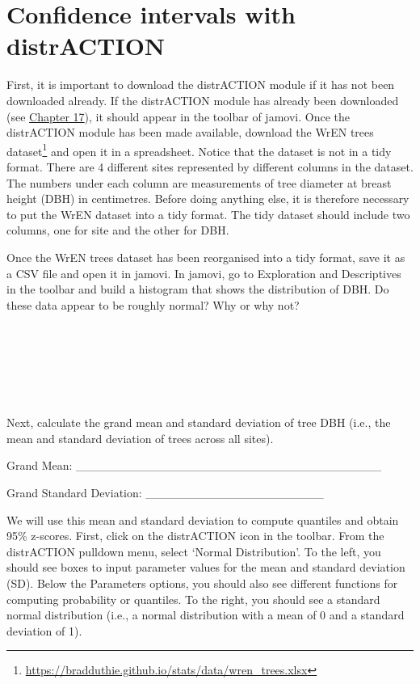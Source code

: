 \documentclass[
  openany]{krantz}
\begin{document}
\hypertarget{confidence-intervals-with-distraction}{%
\section{Confidence intervals with distrACTION}\label{confidence-intervals-with-distraction}}

First, it is important to download the distrACTION module if it has not been downloaded already.
If the distrACTION module has already been downloaded (see \protect\hyperlink{Chapter_17}{Chapter 17}), it should appear in the toolbar of jamovi.
Once the distrACTION module has been made available, download the WrEN trees dataset\footnote{\url{https://bradduthie.github.io/stats/data/wren_trees.xlsx}} and open it in a spreadsheet.
Notice that the dataset is not in a tidy format.
There are 4 different sites represented by different columns in the dataset.
The numbers under each column are measurements of tree diameter at breast height (DBH) in centimetres.
Before doing anything else, it is therefore necessary to put the WrEN dataset into a tidy format.
The tidy dataset should include two columns, one for site and the other for DBH.

Once the WrEN trees dataset has been reorganised into a tidy format, save it as a CSV file and open it in jamovi.
In jamovi, go to Exploration and Descriptives in the toolbar and build a histogram that shows the distribution of DBH.
Do these data appear to be roughly normal?
Why or why not?

\begin{verbatim}






\end{verbatim}

Next, calculate the grand mean and standard deviation of tree DBH (i.e., the mean and standard deviation of trees across all sites).

Grand Mean: \_\_\_\_\_\_\_\_\_\_\_\_\_\_\_\_\_\_\_\_\_\_\_\_\_\_\_\_\_\_\_\_\_\_\_\_

Grand Standard Deviation: \_\_\_\_\_\_\_\_\_\_\_\_\_\_\_\_\_\_\_\_\_

We will use this mean and standard deviation to compute quantiles and obtain 95\% z-scores.
First, click on the distrACTION icon in the toolbar.
From the distrACTION pulldown menu, select `Normal Distribution'.
To the left, you should see boxes to input parameter values for the mean and standard deviation (SD).
Below the Parameters options, you should also see different functions for computing probability or quantiles.
To the right, you should see a standard normal distribution (i.e., a normal distribution with a mean of 0 and a standard deviation of 1).
\end{document}

